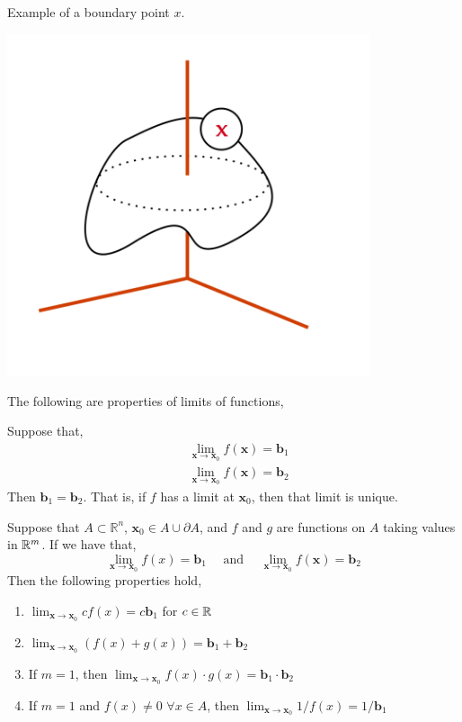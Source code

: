 \begin{marginfigure}
    Example of a boundary point $x$.
    \begin{center}
       \includegraphics[width=0.8\textwidth]{figures/wk-1/fig-18.png}
\end{center}
\end{marginfigure}

\noindent The following are properties of limits of functions,
\begin{rmk}
Suppose that,
\begin{align*}
    &\lim_{\mathbf{x} \rightarrow \mathbf{x}_0} f(\mathbf{x}) = \mathbf{b}_1 \\
    &\lim_{\mathbf{x} \rightarrow \mathbf{x}_0} f(\mathbf{x}) = \mathbf{b}_2
\end{align*}
Then $\mathbf{b}_1 = \mathbf{b}_2$. That is, if $f$ has a limit at $\mathbf{x}_0$, then that limit is unique.
\end{rmk}

\begin{rmk}
Suppose that $A \subset \mathbb{R}^n$, $\mathbf{x}_0 \in A \cup \partial A$, and $f$ and $g$ are functions on $A$ taking values in $\mathbb{R}^m$. If we have that,
\[
\lim_{\mathbf{x} \rightarrow \mathbf{x}_0} f(x)=\mathbf{b}_1 \quad \text { and } \quad \lim_{\mathbf{x} \rightarrow \mathbf{x}_0} f(\mathbf{x})=\mathbf{b}_2
\]
Then the following properties hold,
\begin{enumerate}
    \item $\lim_{\mathbf{x} \rightarrow \mathbf{x}_0} c f(x)= c\mathbf{b}_1$ for $c \in \mathbb{R}$
    \item $\lim_{\mathbf{x} \rightarrow \mathbf{x}_0} (f(x) + g(x)) = \mathbf{b}_1 + \mathbf{b}_2$
    \item If $m = 1$, then $\lim_{\mathbf{x} \rightarrow \mathbf{x}_0} f(x) \cdot g(x) = \mathbf{b}_1 \cdot \mathbf{b}_2$
    \item If $m = 1$ and $f(x) \neq 0$ $ \forall x \in A$, then $\lim_{\mathbf{x} \rightarrow \mathbf{x}_0} 1 / f(x) = 1 / \mathbf{b}_1$ 
\end{enumerate}
\end{rmk}

